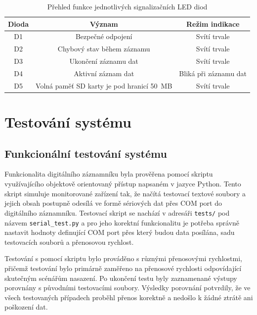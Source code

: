 \begin{table}[h]
    \centering
    \begin{tabular}{|c|c|c|}
        \hline
        \textbf{Dioda} & \textbf{Význam} & \textbf{Režim indikace}              \\
        \hline
        D1 & Bezpečné odpojení                          & Svítí trvale          \\
        \hline
        D2 & Chybový stav během záznamu                 & Svítí trvale          \\
        \hline
        D3 & Ukončení záznamu dat\footnote              & Svítí trvale          \\
        \hline
        D4 & Aktivní záznam dat                         & Bliká při záznamu dat \\
        \hline
        D5 & Volná paměť SD karty je pod hranicí 50~MB  & Svítí trvale          \\
        \hline
    \end{tabular}
    \caption{Přehled funkce jednotlivých signalizačních LED diod}
    \label{tab:signal_leds}
\end{table}

\chapter{Testování systému}
\label{testovani_systemu}

\section{Funkcionální testování systému}
Funkcionalita digitálního záznamníku byla prověřena pomocí skriptu využívajícího objektově orientovaný přístup napsaném v jazyce Python. Tento skript simuluje monitorované zařízení tak, že načítá testovací textové soubory a jejich obsah postupně odesílá ve formě sériových dat přes COM port do digitálního záznamníku. Testovací skript se nachází v adresáři \texttt{tests/} pod názvem \texttt{serial\_test.py} a pro jeho korektní funkcionalitu je potřeba správně nastavit hodnoty definující COM port přes který budou data posílána, sadu testovacích souborů a přenosovou rychlost.

Testování s pomocí skriptu bylo prováděno s různými přenosovými rychlostmi, přičemž testování bylo primárně zaměřeno na přenosové rychlosti odpovídající skutečným scénářům nasazení. Po ukončení testu byly zaznamenané výstupy porovnány s původními testovacími soubory. Výsledky porovnání potvrdily, že ve všech testovaných případech proběhl přenos korektně a nedošlo k žádné ztrátě ani poškození dat.

